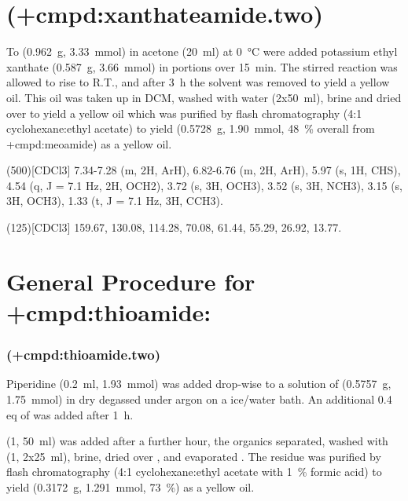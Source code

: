 {\section{ (\cmpd+{cmpd:xanthateamide.two})}

To  (\SI{0.962}{\gram}, \SI{3.33}{\milli\mol}) in acetone ({\SI{20}{\milli\litre}}) at \SI{0}{\celsius} were added potassium ethyl xanthate (\SI{0.587}{\gram}, \SI{3.66}{\milli\mol}) in portions over \SI{15}{\minute}. The stirred reaction was allowed to rise to R.T., and after \SI{3}{\hour} the solvent was removed \invacuo to yield a yellow oil. This oil was taken up in DCM, washed with water (2x\SI{50}{\milli\litre}), brine and dried over  to yield a yellow oil which was purified by flash chromatography (4:1 cyclohexane:ethyl acetate) to yield  (\SI{0.5728}{\gram}, \SI{1.90}{\milli\mol}, \SI{48}{\percent} overall from \cmpd+{cmpd:meoamide}) as a yellow oil.

\NMR(500)[CDCl3] 7.34-7.28 (m, 2H, ArH), 6.82-6.76 (m, 2H, ArH), 5.97 (s, 1H, CHS), 4.54 (q, J = 7.1 Hz, 2H, OCH2), 3.72 (s, 3H, OCH3), 3.52 (s, 3H, NCH3), 3.15 (s, 3H, OCH3), 1.33 (t, J = 7.1 Hz, 3H, CCH3).

(125)[CDCl3] 159.67, 130.08, 114.28, 70.08, 61.44, 55.29, 26.92, 13.77.


\section{General Procedure for \cmpd+{cmpd:thioamide}:}
\subsubsection{ (\cmpd+{cmpd:thioamide.two})}

Piperidine (\SI{0.2}{\milli\litre}, \SI{1.93}{\milli\mol}) was added drop-wise to a solution of  (\SI{0.5757}{\gram}, \SI{1.75}{\milli\mol}) in dry degassed  under argon on a ice/water bath. An additional 0.4 eq of  was added after \SI{1}{\hour}.

 (\SI{1}{\Molar}, \SI{50}{\milli\litre}) was added after a further hour, the organics separated, washed with  (\SI{1}{\Molar}, 2x\SI{25}{\milli\litre}), brine, dried over , and evaporated \invacuo. The residue was purified by flash chromatography (4:1 cyclohexane:ethyl acetate with \SI{1}{\percent} formic acid) to yield  (\SI{0.3172}{\gram}, \SI{1.291}{\milli\mol}, \SI{73}{\percent}) as a yellow oil.

}
